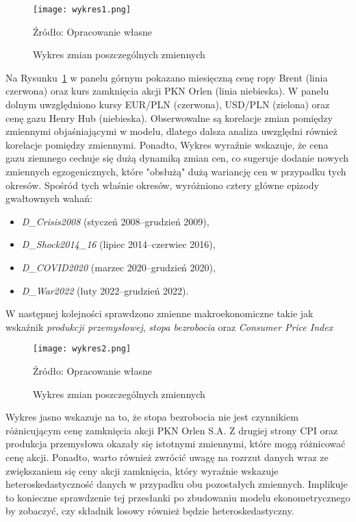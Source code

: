 \documentclass[12pt, twoside]{article}
\begin{document}
\begin{figure}[H]
    \centering
    \texttt{[image: wykres1.png]}
    \caption{Wykres zmian poszczególnych zmiennych}
    \label{fig:brent_pkn}
    \vspace{0.1cm}
    {\parbox[t]{\linewidth}{\raggedright Źródło: Opracowanie własne}}

\end{figure}
Na Rysunku~\ref{fig:brent_pkn} w panelu górnym pokazano miesięczną cenę ropy Brent (linia czerwona) oraz kurs zamknięcia akcji PKN Orlen (linia niebieska). W panelu dolnym uwzględniono kursy EUR/PLN (czerwona), USD/PLN (zielona) oraz cenę gazu Henry Hub (niebieska). Obserwowalne są korelacje zmian pomiędzy zmiennymi objaśniającymi w modelu, dlatego dalsza analiza uwzględni również korelacje pomiędzy zmiennymi. Ponadto, Wykres wyraźnie wskazuje, że cena gazu ziemnego cechuje się dużą dynamiką zmian cen, co sugeruje dodanie nowych zmiennych egzogenicznych, które "obsłużą" dużą wariancję cen w przypadku tych okresów. Spośród tych właśnie okresów, wyróżniono cztery główne epizody gwałtownych wahań:
\begin{itemize}
  \item \textit{D\_Crisis2008} (styczeń 2008–grudzień 2009),
  \item \textit{D\_Shock2014\_16} (lipiec 2014–czerwiec 2016),
  \item \textit{D\_COVID2020} (marzec 2020–grudzień 2020),
  \item \textit{D\_War2022} (luty 2022–grudzień 2022).
\end{itemize} 

W następnej kolejności sprawdzono zmienne makroekonomiczne takie jak wskaźnik \textit{produkcji przemysłowej}, \textit{stopa bezrobocia} oraz \textit{Consumer Price Index} 

\begin{figure}[H]
    \centering
    \texttt{[image: wykres2.png]}
    \caption{Wykres zmian poszczególnych zmiennych}
    \label{fig:cpi_ip_undemp}
    \vspace{0.1cm}
    {\parbox[t]{\linewidth}{\raggedright Źródło: Opracowanie własne}}

\end{figure}

Wykres jasno wskazuje na to, że stopa bezrobocia nie jest czynnikiem różnicującym cenę zamknięcia akcji PKN Orlen S.A. Z drugiej strony CPI oraz produkcja przemysłowa okazały się istotnymi zmiennymi, które mogą różnicować cenę akcji. Ponadto, warto również zwrócić uwagę na rozrzut danych wraz ze zwiększaniem się ceny akcji zamknięcia, który wyraźnie wskazuje heteroskedastyczność danych w przypadku obu pozostałych zmiennych. Implikuje to konieczne sprawdzenie tej przesłanki po zbudowaniu modelu ekonometrycznego by zobaczyć, czy składnik losowy również będzie heteroskedastyczny.
\end{document}
